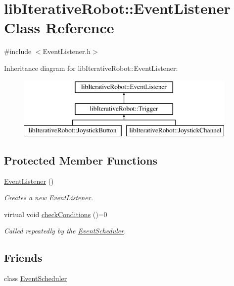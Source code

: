 \hypertarget{classlib_iterative_robot_1_1_event_listener}{}\section{lib\+Iterative\+Robot\+::Event\+Listener Class Reference}
\label{classlib_iterative_robot_1_1_event_listener}


{\ttfamily \#include $<$Event\+Listener.\+h$>$}

Inheritance diagram for lib\+Iterative\+Robot\+::Event\+Listener\+:\begin{figure}[H]
\begin{center}
\leavevmode
\includegraphics[height=3.000000cm]{classlib_iterative_robot_1_1_event_listener}
\end{center}
\end{figure}
\subsection*{Protected Member Functions}
\begin{DoxyCompactItemize}
\item 
\mbox{\hyperlink{classlib_iterative_robot_1_1_event_listener_ac8cfe1097cbec18fac9313feccdb0e20}{Event\+Listener}} ()
\begin{DoxyCompactList}\small\item\em Creates a new \mbox{\hyperlink{classlib_iterative_robot_1_1_event_listener}{Event\+Listener}}. \end{DoxyCompactList}\item 
virtual void \mbox{\hyperlink{classlib_iterative_robot_1_1_event_listener_aacbdd1cd66bf22e081add72b127af3a1}{check\+Conditions}} ()=0
\begin{DoxyCompactList}\small\item\em Called repeatedly by the \mbox{\hyperlink{classlib_iterative_robot_1_1_event_scheduler}{Event\+Scheduler}}. \end{DoxyCompactList}\end{DoxyCompactItemize}
\subsection*{Friends}
\begin{DoxyCompactItemize}
\item 
class \mbox{\hyperlink{classlib_iterative_robot_1_1_event_listener_a2a47195be57876de9e0c9e18467a34a3}{Event\+Scheduler}}
\end{DoxyCompactItemize}


